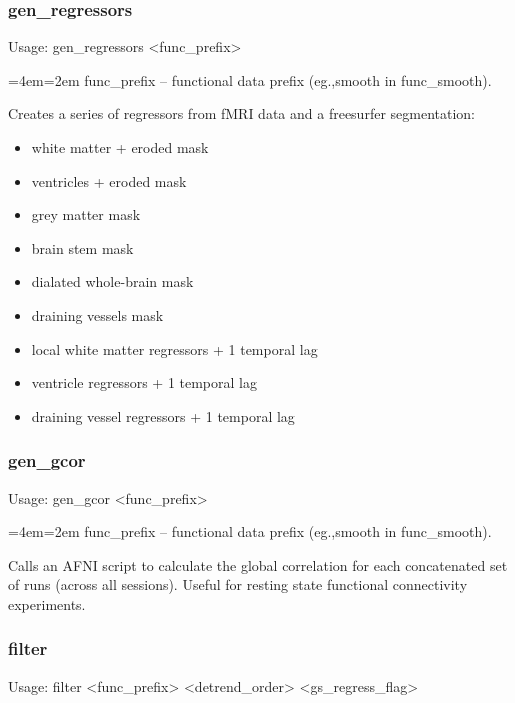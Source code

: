\documentclass[final,titlepage,letterpaper,oneside,12pt]{article}
\renewcommand{\texttt}[2][BrickRed]{\textcolor{#1}{\ttfamily #2}}%
\newenvironment{blockquote}{%
  \par%
  \medskip
  \leftskip=4em\rightskip=2em%
  \noindent\ignorespaces}{%
  \par\medskip}
\begin{document}
\subsubsection{gen\_regressors}
Usage: \texttt{gen\_regressors <func\_prefix>}

\begin{blockquote}
func\_prefix -- functional data prefix (eg.,smooth in func\_smooth).
\end{blockquote}

\noindent Creates a series of regressors from fMRI data and a freesurfer segmentation: 

\begin{itemize} \itemsep-2pt
	\item{white matter + eroded mask}
	\item{ventricles + eroded mask}
	\item{grey matter mask}
	\item{brain stem mask}
	\item{dialated whole-brain mask}
	\item{draining vessels mask}
	\item{local white matter regressors + 1 temporal lag}
	\item{ventricle regressors + 1 temporal lag}
	\item{draining vessel regressors + 1 temporal lag}
\end{itemize}

\subsubsection{gen\_gcor}
Usage: \texttt{gen\_gcor <func\_prefix>}

\begin{blockquote}
func\_prefix -- functional data prefix (eg.,smooth in func\_smooth).
\end{blockquote}

\noindent Calls an AFNI script to calculate the global correlation for each concatenated set of runs (across all sessions). Useful for resting state functional connectivity experiments.

\subsubsection{filter}
Usage: \texttt{filter <func\_prefix> <detrend\_order> <gs\_regress\_flag>}
\end{document}
